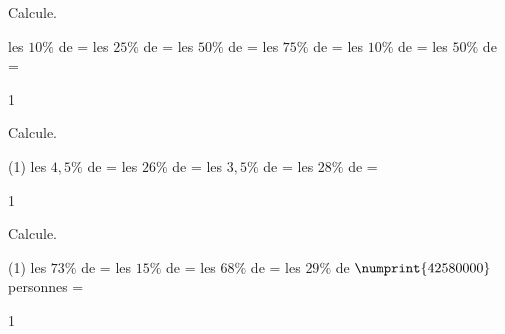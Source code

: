 \documentclass[a4paper,11pt]{report}
\begin{document}
\begin{exop}{
    Calcule.
    \begin{tasks}
        \task les $10\%$ de  = \hrulefill
        \task les $25\%$ de  = \hrulefill
        \task les $50\%$ de  = \hrulefill
        \task les $75\%$ de  = \hrulefill
        \task les $10\%$ de  = \hrulefill
        \task les $50\%$ de  = \hrulefill
    \end{tasks}
}{1}
\end{exop}


\begin{exop}{
Calcule.
\begin{tasks}(1)
    \task les $4,5\%$ de  = \hrulefill
    \task les $26\%$ de  = \hrulefill
    \task les $3,5\%$ de  = \hrulefill
    \task les $28\%$ de  = \hrulefill
\end{tasks}
}{1}    
\end{exop}

\begin{exop}{
Calcule.
\begin{tasks}(1)
    \task les $73\%$ de  = \hrulefill
    \task les $15\%$ de  = \hrulefill
    \task les $68\%$ de  = \hrulefill
    \task les $29\%$ de $\numprint{42580000}$ personnes = \hrulefill
\end{tasks}
}{1}    
\end{exop}
\end{document}
